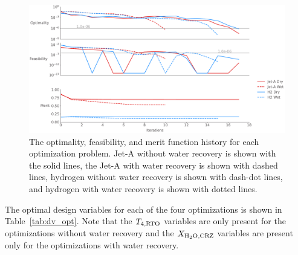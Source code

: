 \documentclass[conf]{new-aiaa}
\begin{document}
\begin{figure}[hbt!]
  \centering
  \includegraphics[width=1.0\textwidth]{opt_summary.pdf}
  \caption{The optimality, feasibility, and merit function history for each optimization problem.
    Jet-A without water recovery is shown with the solid lines, the Jet-A with water recovery is shown with dashed lines, hydrogen without water recovery is shown with dash-dot lines, and hydrogen with water recovery is shown with dotted lines.}
  \label{fig:history_summary}
\end{figure}

The optimal design variables for each of the four optimizations is shown in Table~\ref{tab:dv_opt}.
Note that the $T_{4,\rm{RTO}}$ variables are only present for the optimizations without water recovery and the $X_{\rm{{H_2O},CRZ}}$ variables are present only for the optimizations with water recovery.
\end{document}
